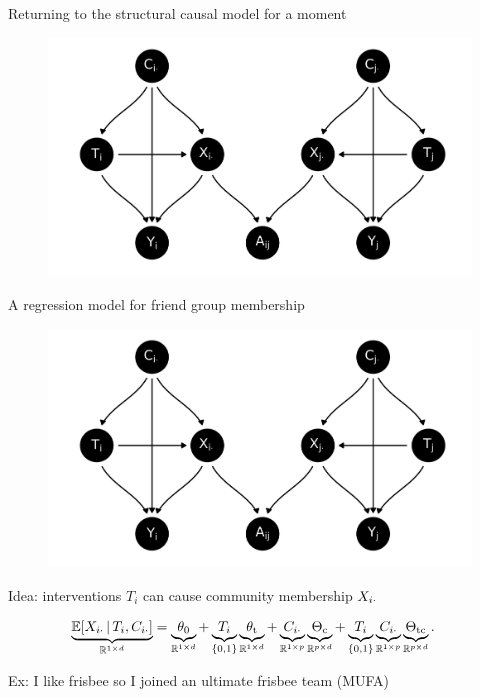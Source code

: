 \documentclass{beamer}
\theoremstyle{remark}
\begin{document}
\begin{frame}{Returning to the structural causal model for a moment}

    \centering

    \begin{figure}
        \includegraphics[scale=0.65]{figures/dags/mediating-5.png}
        \label{fig:mediating-5-again}
    \end{figure}

\end{frame}

\begin{frame}{A regression model for friend group membership}

    \centering

    \begin{figure}
        \includegraphics[scale=0.35]{figures/dags/mediating-5.png}
        \label{fig:mediating-5-again}
    \end{figure}

    Idea: interventions $T_i$ can cause community membership $X_{i \cdot}$

    \begin{align*}
        \underbrace{\E[T_i, \C_{i \cdot}]{\X_{i \cdot}}}_{\R^{1 \times d}}
         & = \underbrace{\thetazero}_{\R^{1 \times d}}
        + \underbrace{T_i}_{\{0, 1\}} \underbrace{\thetat}_{\R^{1 \times d}}
        + \underbrace{\C_{i \cdot}}_{\R^{1 \times p}} \underbrace{\Thetac}_{\R^{p \times d}}
        + \underbrace{T_i}_{\{0, 1\}} \underbrace{\C_{i \cdot}}_{\R^{1 \times p}} \underbrace{\Thetatc}_{\R^{p \times d}}.
    \end{align*}

    Ex: I like frisbee so I joined an ultimate frisbee team (MUFA)

\end{frame}
\end{document}
